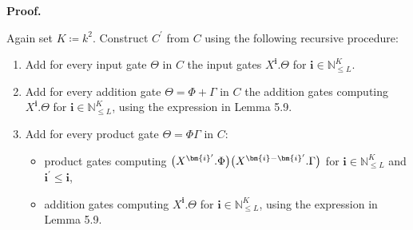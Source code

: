 \documentclass[10pt,a4paper]{article}
\begin{document}
\par\medskip\noindent\textbf{Proof.}\par




Again set $K\coloneqq k^{2}$.
Construct $C^{\prime}$ from $C$ using the following recursive procedure:



\begin{enumerate}


\item 
 


Add for every input gate $\Theta$
in $C$ the input gates
$X^{\bm{i}}.\Theta$ for ${\bm{i}}\in\mathbb{N}^{K}_{\leq L}$.





\item 
 


Add for every addition gate $\Theta=\Phi+\Gamma$ in $C$ the addition gates computing
$X^{\bm{i}}.\Theta$ for ${\bm{i}}\in\mathbb{N}^{K}_{\leq L}$, using the expression in Lemma 5.9.





\item 
 


Add for every product gate $\Theta=\Phi\Gamma$ in $C$:



\begin{itemize}


\item 
 


product gates computing
$\big{(}X^{{\bm{i}}^{\prime}}.\Phi\big{)}\big{(}X^{{\bm{i}}-{\bm{i}}^{\prime}}.\Gamma\big{)}$
for ${\bm{i}}\in\mathbb{N}^{K}_{\leq L}$ and ${\bm{i}}^{\prime}\leq{\bm{i}}$,





\item 
 


addition gates computing
$X^{\bm{i}}.\Theta$ for ${\bm{i}}\in\mathbb{N}^{K}_{\leq L}$, using the expression in Lemma 5.9.





\end{itemize}





\end{enumerate}
\end{document}
